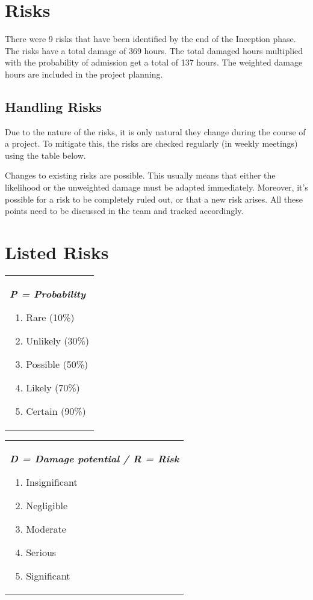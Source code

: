 \section{Risks}
There were 9 risks that have been identified by the end of the Inception phase.
The risks have a total damage of 369 hours. The total damaged hours multiplied
with the probability of admission get a total of 137 hours. The weighted damage
hours are included in the project planning.

\subsection{Handling Risks}
Due to the nature of the risks, it is only natural they change during the course of a project.
To mitigate this, the risks are checked regularly (in weekly meetings) using the table below.

Changes to existing risks are possible. This usually means that either the likelihood or
the unweighted damage must be adapted immediately. Moreover, it's possible for a risk to
be completely ruled out, or that a new risk arises. All these points need to be discussed in
the team and tracked accordingly.

\section{Listed Risks}
\begin{tabular}[t]{@{}>{\raggedright}p{}}
  \textbf{\textit{P = Probability}}
  \begin{enumerate}[topsep=0pt,itemsep=-2pt,leftmargin=13pt]
  \item Rare (10\%)
  \item Unlikely (30\%)
  \item Possible (50\%)
  \item Likely (70\%)
  \item Certain (90\%)
  \end{enumerate}
\end{tabular}
\begin{tabular}[t]{@{}>{\raggedright}p{}@{}}
  \textbf{\textit{D = Damage potential  / R = Risk}}
  \begin{enumerate}[topsep=0pt,itemsep=-2pt,leftmargin=13pt]
  \item Insignificant
  \item Negligible
  \item Moderate
  \item Serious
  \item Significant
  \end{enumerate}
\end{tabular}

